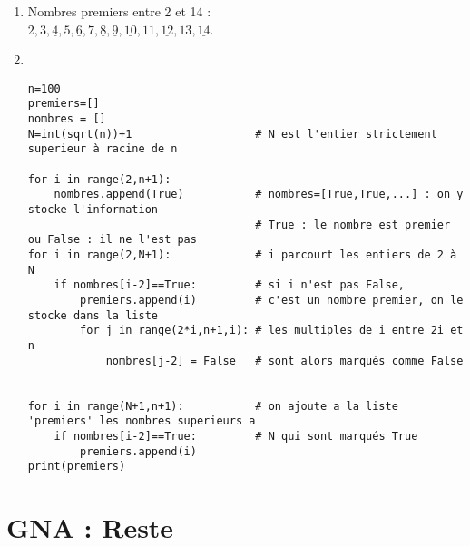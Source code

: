 \begin{solution}
\begin{enumerate}
\item Nombres premiers entre 2 et 14 :\\
$2, 3, \underline{4},5,\underline{6},7,\underline{8},\underline{9},\underline{10},11,\underline{12},13,\underline{14}$. 
\item ~\\
\vspace{-0.7cm} \begin{verbatim}
n=100
premiers=[]
nombres = []
N=int(sqrt(n))+1                   # N est l'entier strictement superieur à racine de n

for i in range(2,n+1):
    nombres.append(True)           # nombres=[True,True,...] : on y stocke l'information 
                                   # True : le nombre est premier ou False : il ne l'est pas
for i in range(2,N+1):             # i parcourt les entiers de 2 à N
    if nombres[i-2]==True:         # si i n'est pas False, 
        premiers.append(i)         # c'est un nombre premier, on le stocke dans la liste
        for j in range(2*i,n+1,i): # les multiples de i entre 2i et n
            nombres[j-2] = False   # sont alors marqués comme False
                                   
            
for i in range(N+1,n+1):           # on ajoute a la liste 'premiers' les nombres superieurs a 
    if nombres[i-2]==True:         # N qui sont marqués True   
        premiers.append(i)             
print(premiers)
\end{verbatim}
\end{enumerate}
\end{solution}













\section{GNA : Reste}

%


